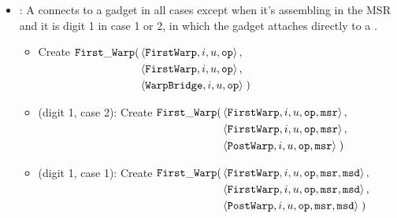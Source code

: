 \begin{itemize}
        \item {\firstwarp}: A {\firstwarp} connects to a {\warpbridge} gadget in all cases except when it's assembling
              in the MSR and it is digit 1 in case 1 or 2, in which the {\firstwarp} gadget attaches directly
              to a {\postwarp}.

              \begin{itemize}

                \item Create
                $\begin{aligned}[t]
                    {\tt First\_Warp}(& \left\langle {\tt FirstWarp},  i, u, {\tt op} \right\rangle, \\
                               & \left\langle {\tt FirstWarp},  i, u, {\tt op} \right\rangle, \\
                               & \left\langle {\tt WarpBridge}, i, u, {\tt op} \right\rangle \;)
                \end{aligned}$
                \vspace{.5cm}

                \item (digit 1, case 2): Create
                $\begin{aligned}[t]
                    {\tt First\_Warp}(& \left\langle {\tt FirstWarp}, i, u, {\tt op}, {\tt msr} \right\rangle, \\
                               & \left\langle {\tt FirstWarp}, i, u, {\tt op}, {\tt msr} \right\rangle, \\
                               & \left\langle {\tt PostWarp},  i, u, {\tt op}, {\tt msr} \right\rangle \;)
                \end{aligned}$
                \vspace{.5cm}

                \item (digit 1, case 1): Create
                $\begin{aligned}[t]
                    {\tt First\_Warp}(& \left\langle {\tt FirstWarp}, i, u, {\tt op}, {\tt msr}, {\tt msd} \right\rangle, \\
                               & \left\langle {\tt FirstWarp}, i, u, {\tt op}, {\tt msr}, {\tt msd} \right\rangle, \\
                               & \left\langle {\tt PostWarp},  i, u, {\tt op}, {\tt msr}, {\tt msd} \right\rangle \;)
                \end{aligned}$
                \vspace{.5cm}


\end{itemize}
\end{itemize}
